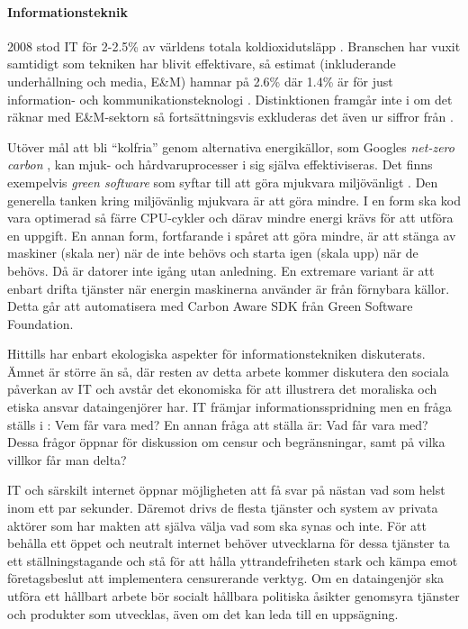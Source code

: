 \documentclass[12pt]{article}
\begin{document}
\paragraph{Informationsteknik}

2008 stod IT för 2-2.5\% av världens totala koldioxidutsläpp
\cite[283]{gullikssonHolmgren}. Branschen har vuxit samtidigt som
tekniken har blivit effektivare, så estimat (inkluderande
underhållning och media, E\&M) hamnar på 2.6\% där 1.4\% är
för just information- och kommunikationsteknologi
\cite{ictFootprints}. Distinktionen framgår inte i
\cite[283]{gullikssonHolmgren} om det räknar med E\&M-sektorn så
fortsättningsvis exkluderas det även ur siffror från
\cite{ictFootprints}.

Utöver mål att bli ``kolfria'' genom alternativa energikällor,
som Googles \textit{net-zero carbon} \cite{googleNetZeroCarbon},
kan mjuk- och hårdvaruprocesser i sig själva effektiviseras. Det
finns exempelvis \textit{green software} som syftar till att göra
mjukvara miljövänligt \cite{greenSoftwareFoundation}. Den
generella tanken kring miljövänlig mjukvara är att göra mindre.
I en form ska kod vara optimerad så färre CPU-cykler och
därav mindre energi krävs för att utföra en uppgift. En annan
form, fortfarande i spåret att göra mindre, är att stänga av
maskiner (skala ner) när de inte behövs och starta igen (skala
upp) när de behövs. Då är datorer inte igång utan anledning.
En extremare variant är att enbart drifta tjänster när energin
maskinerna använder är från förnybara källor. Detta går att
automatisera med Carbon Aware SDK \cite{carbonAwareSdk} från
Green Software Foundation.

Hittills har enbart ekologiska aspekter för informationstekniken
diskuterats. Ämnet är större än så, där resten av detta arbete
kommer diskutera den sociala påverkan av IT och avstår det
ekonomiska för att illustrera det moraliska och etiska ansvar
dataingenjörer har. IT främjar informationsspridning men en fråga
ställs i \cite[284]{gullikssonHolmgren}: Vem får vara med? En
annan fråga att ställa är: Vad får vara med? Dessa frågor öppnar
för diskussion om censur och begränsningar, samt på vilka villkor
får man delta?

IT och särskilt internet öppnar möjligheten att få svar på nästan
vad som helst inom ett par sekunder. Däremot drivs de flesta
tjänster och system av privata aktörer som har makten att själva
välja vad som ska synas och inte. För att behålla ett öppet och
neutralt internet behöver utvecklarna för dessa tjänster ta ett
ställningstagande och stå för att hålla yttrandefriheten stark
och kämpa emot företagsbeslut att implementera censurerande
verktyg. Om en dataingenjör ska utföra ett hållbart arbete bör
socialt hållbara politiska åsikter genomsyra tjänster och
produkter som utvecklas, även om det kan leda till en uppsägning.

\printbibliography
\end{document}
